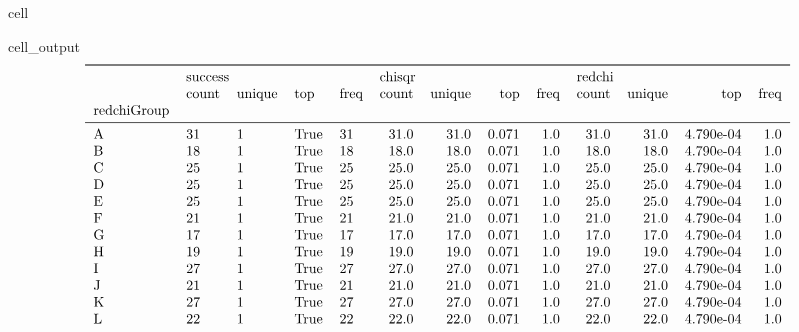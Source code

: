 \documentclass[letterpaper,table,10pt,english]{jupyterBook}
\begin{document}
\begin{sphinxuseclass}{cell}
\begin{sphinxVerbatimOutput}
\begin{sphinxuseclass}{cell_output}\begin{equation*}
\begin{split}\begin{tabular}{lllllrrrrrrrr}
\toprule
{} & \multicolumn{4}{l}{success} & \multicolumn{4}{l}{chisqr} & \multicolumn{4}{l}{redchi} \\
{} &   count & unique &   top & freq &  count & unique &    top & freq &  count & unique &        top & freq \\
redchiGroup &         &        &       &      &        &        &        &      &        &        &            &      \\
\midrule
A           &      31 &      1 &  True &   31 &   31.0 &   31.0 &  0.071 &  1.0 &   31.0 &   31.0 &  4.790e-04 &  1.0 \\
B           &      18 &      1 &  True &   18 &   18.0 &   18.0 &  0.071 &  1.0 &   18.0 &   18.0 &  4.790e-04 &  1.0 \\
C           &      25 &      1 &  True &   25 &   25.0 &   25.0 &  0.071 &  1.0 &   25.0 &   25.0 &  4.790e-04 &  1.0 \\
D           &      25 &      1 &  True &   25 &   25.0 &   25.0 &  0.071 &  1.0 &   25.0 &   25.0 &  4.790e-04 &  1.0 \\
E           &      25 &      1 &  True &   25 &   25.0 &   25.0 &  0.071 &  1.0 &   25.0 &   25.0 &  4.790e-04 &  1.0 \\
F           &      21 &      1 &  True &   21 &   21.0 &   21.0 &  0.071 &  1.0 &   21.0 &   21.0 &  4.790e-04 &  1.0 \\
G           &      17 &      1 &  True &   17 &   17.0 &   17.0 &  0.071 &  1.0 &   17.0 &   17.0 &  4.790e-04 &  1.0 \\
H           &      19 &      1 &  True &   19 &   19.0 &   19.0 &  0.071 &  1.0 &   19.0 &   19.0 &  4.790e-04 &  1.0 \\
I           &      27 &      1 &  True &   27 &   27.0 &   27.0 &  0.071 &  1.0 &   27.0 &   27.0 &  4.790e-04 &  1.0 \\
J           &      21 &      1 &  True &   21 &   21.0 &   21.0 &  0.071 &  1.0 &   21.0 &   21.0 &  4.790e-04 &  1.0 \\
K           &      27 &      1 &  True &   27 &   27.0 &   27.0 &  0.071 &  1.0 &   27.0 &   27.0 &  4.790e-04 &  1.0 \\
L           &      22 &      1 &  True &   22 &   22.0 &   22.0 &  0.071 &  1.0 &   22.0 &   22.0 &  4.790e-04 &  1.0 \\

\end{tabular}
\end{split}
\end{equation*}
\end{sphinxuseclass}
\end{sphinxVerbatimOutput}
\end{sphinxuseclass}
\end{document}

